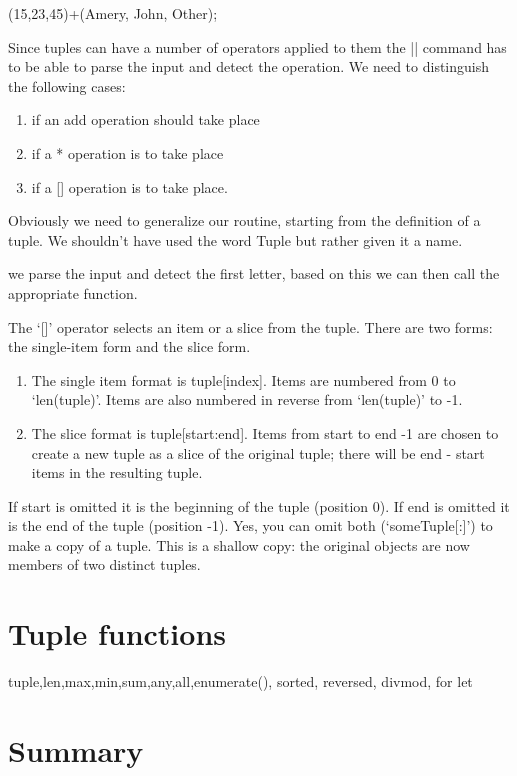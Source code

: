 \Tuple (15,23,45)+(Amery, John, Other);


\newtuple


Since tuples can have a number of operators applied to them the |\Tuple| command has to be able to parse the input and detect the operation. We need to distinguish the following cases:

\begin{enumerate}
\item if an add operation should take place
\item if a * operation is to take place
\item if a [] operation is to take place.
\end{enumerate}


Obviously we need to generalize our routine, starting from the definition of a tuple. We shouldn't have used the word Tuple but rather given it a name.



we parse the input and detect the first letter, based on this we can then call the appropriate function.


The ‘[]’ operator selects an item or a slice from the tuple.
There are two forms: the single-item form and the slice form.

\begin{enumerate}
\item The single item format is tuple[index]. Items are numbered from 0 to `len(tuple)'. Items are also
numbered in reverse from `len(tuple)' to -1.

\item The slice format is tuple[start:end]. Items from start to end -1 are chosen to create a new tuple
as a slice of the original tuple; there will be end - start items in the resulting tuple.
\end{enumerate}


If start is omitted it is the beginning of the tuple (position 0).
If end is omitted it is the end of the tuple (position -1).
Yes, you can omit both (‘someTuple[:]’) to make a copy of a tuple. This is a shallow copy: the
original objects are now members of two distinct tuples.

\section{Tuple functions}

tuple,len,max,min,sum,any,all,enumerate(), sorted, reversed, divmod, for let


\section{Summary}


